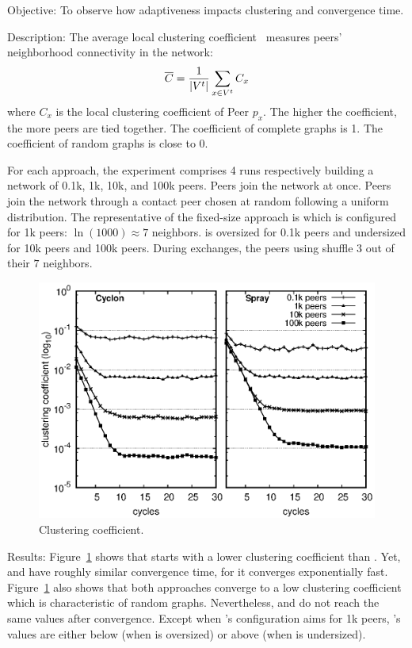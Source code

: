 \begin{asparadesc}
\item[Objective:] To observe how adaptiveness impacts clustering and convergence
  time.
\item[Description:] The average local clustering
  coefficient~\cite{watts1998collective} measures peers' neighborhood
  connectivity in the network:
  \begin{equation*}
    \overline{C} = {1\over |V^t|}\sum\limits_{x\in V^t}C_x
  \end{equation*}
  where $C_x$ is the local clustering coefficient of Peer $p_x$. The higher the
  coefficient, the more peers are tied together. The coefficient of complete
  graphs is 1. The coefficient of random graphs is close to 0.  

  For each approach, the experiment comprises 4 runs respectively building a
  network of 0.1k, 1k, 10k, and 100k peers. Peers join the network at
  once. Peers join the network through a contact peer chosen at random following
  a uniform distribution. The representative of the fixed-size approach is
  \CYCLON which is configured for 1k peers: $\ln(1000)\approx 7$
  neighbors.  \CYCLON is oversized for 0.1k peers and undersized for 10k peers
  and 100k peers. During exchanges, the peers using \CYCLON shuffle $3$ out of
  their $7$ neighbors.

\begin{figure}
  \centering
  \includegraphics[width=\SCALE\textwidth]{img/clustering.eps}
  \caption{\label{fig:clustering}Clustering coefficient.}
\end{figure}

\item[Results:] Figure~\ref{fig:clustering} shows that \CYCLON starts with a
  lower clustering coefficient than \SPRAY.  Yet, \CYCLON and \SPRAY have
  roughly similar convergence time, for it converges exponentially fast.
  Figure~\ref{fig:clustering} also shows that both approaches converge to a low
  clustering coefficient which is characteristic of random graphs. Nevertheless,
  \CYCLON and \SPRAY do not reach the same values after convergence. Except when
  \CYCLON's configuration aims for 1k peers, \SPRAY's values are either below
  (when \CYCLON is oversized) or above (when \CYCLON is undersized).
  

\end{asparadesc}
